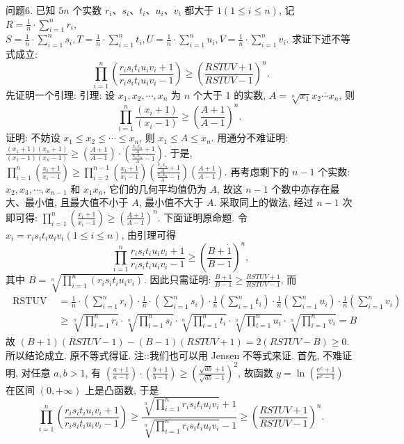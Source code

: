 问题6. 已知 $5 n$ 个实数 $r_i 、 s_i 、 t_i 、 u_i 、 v_i$ 都大于 $1(1 \leqslant i \leqslant n)$, 记 $R=\frac{1}{n} \cdot \sum_{i=1}^n r_i$, $S=\frac{1}{n} \cdot \sum_{i=1}^n s_i, T=\frac{1}{n} \cdot \sum_{i=1}^n t_i, U=\frac{1}{n} \cdot \sum_{i=1}^n u_i, V=\frac{1}{n} \cdot \sum_{i=1}^n v_i$. 求证下述不等式成立:
$$
\prod_{i=1}^n\left(\frac{r_i s_i t_i u_i v_i+1}{r_i s_i t_i u_i v_i-1}\right) \geqslant\left(\frac{R S T U V+1}{R S T U V-1}\right)^n .
$$
先证明一个引理:
引理: 设 $x_1, x_2, \cdots, x_n$ 为 $n$ 个大于 1 的实数, $A=\sqrt[n]{x_1} \overline{x_2 \cdots x_n}$, 则
$$
\prod_{i=1}^n \frac{\left(x_i+1\right)}{\left(x_i-1\right)} \geqslant\left(\frac{A+1}{A-1}\right)^n \text {. }
$$
证明: 不妨设 $x_1 \leqslant x_2 \leqslant \cdots \leqslant x_n$, 则 $x_1 \leqslant A \leqslant x_n$.
用通分不难证明: $\frac{\left(x_1+1\right)\left(x_n+1\right)}{\left(x_1-1\right)\left(x_n-1\right)} \geqslant\left(\frac{A+1}{A-1}\right) \cdot\left(\frac{\frac{x_1 x_n}{A}+1}{\frac{x_1 x_n}{A}-1}\right)$.
于是, $\prod_{i=1}^n\left(\frac{x_i+1}{x_i-1}\right) \geqslant \prod_{i=2}^{n-1}\left(\frac{x_i+1}{x_i-1}\right)\left(\frac{\frac{x_1 x_n}{A}+1}{\frac{x_1 x_n}{A}-1}\right)\left(\frac{A+1}{A-1}\right)$.
再考虑剩下的 $n-1$ 个实数: $x_2, x_3, \cdots, x_{n-1}$ 和 $x_1 x_n$, 它们的几何平均值仍为 $A$, 故这 $n-1$ 个数中亦存在最大、最小值, 且最大值不小于 $A$, 最小值不大于 $A$. 采取同上的做法, 经过 $n-1$ 次即可得: $\prod_{i=1}^n\left(\frac{x_i+1}{x_i-1}\right) \geqslant\left(\frac{A+1}{A-1}\right)^n$.
下面证明原命题.
令 $x_i=r_i s_i t_i u_i v_i(1 \leqslant i \leqslant n)$, 由引理可得
$$
\prod_{i=1}^n \frac{r_i s_i t_i u_i v_i+1}{r_i s_i t_i u_i v_i-1} \geqslant\left(\frac{B+\dot{1}}{B-1}\right)^n,
$$
其中 $B=\sqrt[n]{\prod_{i=1}^n\left(r_i s_i t_i u_i v_i\right)}$. 因此只需证明: $\frac{B+1}{B-1} \geqslant \frac{R S T U V+1}{R S T U V-1}$, 而
$$
\begin{aligned}
\text { RSTUV } & =\frac{1}{n} \cdot\left(\sum_{i=1}^n r_i\right) \cdot \frac{1}{n} \cdot\left(\sum_{i=1}^n s_i\right) \cdot \frac{1}{n}\left(\sum_{i=1}^n t_i\right) \cdot \frac{1}{n}\left(\sum_{i=1}^n u_i\right) \cdot \frac{1}{n}\left(\sum_{i=1}^n v_i\right) \\
& \geqslant \sqrt[n]{\prod_{i=1}^n r_i} \cdot \sqrt[n]{\prod_{i=1}^n s_i} \cdot \sqrt[n]{\prod_{i=1}^n t_i} \cdot \sqrt[n]{\prod_{i=1}^n u_i} \cdot \sqrt[n]{\prod_{i=1}^n v_i}=B
\end{aligned}
$$
故 $(B+1)(R S T U V-1)-(B-1)(R S T U V+1)=2(R S T U V-B) \geqslant 0$.
所以结论成立.
原不等式得证.
注::我们也可以用 Jensen 不等式来证.
首先, 不难证明, 对任意 $a, b>1$, 有 $\left(\frac{a+1}{a-1}\right) \cdot\left(\frac{b+1}{b-1}\right) \geqslant\left(\frac{\sqrt{a b}+1}{\sqrt{a b}-1}\right)^2$,
故函数 $y=\ln \left(\frac{\mathrm{e}^x+1}{\mathrm{e}^x-1}\right)$ 在区间 $(0,+\infty)$ 上是凸函数, 于是
$$
\prod_{i=1}^n\left(\frac{r_i s_i t_i u_i v_i+1}{r_i s_i t_i u_i v_i-1}\right) \geqslant \frac{\sqrt[n]{\prod_{i=1}^n r_i s_i t_i u_i v_i}+1}{\sqrt[n]{\prod_{i=1}^n r_i s_i t_i u_i v_i}-1} \geqslant\left(\frac{R S T U V+1}{R S T U V-1}\right)^n .
$$



